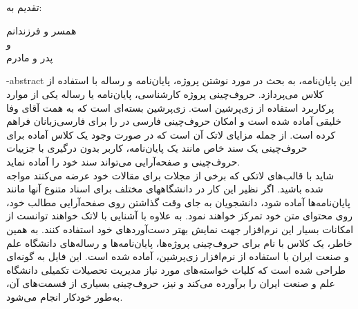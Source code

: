 
 \newpage
\thispagestyle{empty}
{\Large تقدیم به:}\\
\begin{flushleft}
{\huge
همسر و فرزندانم\\
\vspace{7mm}
و\\
\vspace{7mm}
پدر و مادرم
}
\end{flushleft}


\fa-abstract{
این پایان‌نامه، به بحث در مورد نوشتن پروژه، پایان‌نامه و رساله با استفاده از کلاس 
می‌پردازد.
حروف‌چینی پروژه کارشناسی، پایان‌نامه یا رساله یکی از موارد پرکاربرد استفاده از زی‌پرشین است. 
زی‌پرشین بسته‌ای است که به همت آقای وفا خلیقی آماده شده است و امکان حروف‌چینی فارسی در \lr{\LaTeXe}{} را  برای فارسی‌زبانان فراهم کرده است.
از جمله مزایای لاتک آن است که در صورت وجود یک کلاس آماده برای حروف‌چینی یک سند خاص مانند یک پایان‌نامه، کاربر بدون درگیری با جزییات حروف‌چینی و صفحه‌آرایی می‌تواند سند خود را آماده نماید.
\\
شاید با قالب‌های لاتکی که برخی از مجلات برای مقالات خود عرضه می‌کنند مواجه شده باشید. اگر نظیر این کار در دانشگاههای مختلف برای اسناد متنوع آنها مانند پایا‌ن‌نامه‌ها آماده شود، دانشجویان به جای وقت گذاشتن روی صفحه‌آرایی مطالب خود، روی محتوای متن خود تمرکز خواهند نمود. به علاوه با آشنایی با لاتک خواهند توانست از امکانات بسیار این نرم‌افزار جهت نمایش بهتر دست‌آوردهای خود استفاده کنند.
به همین خاطر، یک کلاس با نام 
 برای حروف‌چینی پروژه‌ها، پایان‌نامه‌ها و رساله‌های دانشگاه علم و صنعت ایران با استفاده از نرم‌افزار زی‌پرشین،  آماده شده است. این فایل به 
گونه‌ای طراحی شده است که کلیات خواسته‌های مورد نیاز  مدیریت تحصیلات تکمیلی دانشگاه علم و صنعت ایران را برآورده می‌کند و نیز، حروف‌چینی بسیاری از قسمت‌های آن، به‌طور خودکار انجام می‌شود.
}

